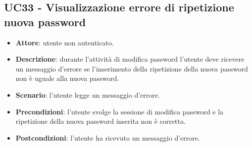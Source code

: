 \subsection{UC33 - Visualizzazione errore di ripetizione nuova password}
\begin{itemize}
    \item \textbf{Attore}: utente non autenticato.
    \item \textbf{Descrizione}: durante l'attività di modifica password l'utente deve ricevere un messaggio d'errore se l'inserimento della ripetizione della nuova password non è uguale alla nuova password.
    \item \textbf{Scenario}: l'utente legge un messaggio d'errore. 
    \item \textbf{Precondizioni}: l'utente svolge la sessione di modifica password e la ripetizione della nuova password inserita non è corretta.
    \item \textbf{Postcondizioni}: l'utente ha ricevuto un messaggio d'errore.
\end{itemize}

